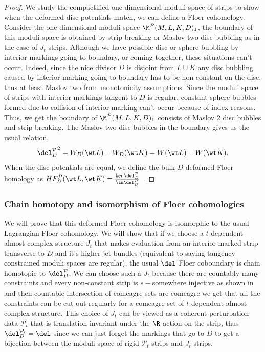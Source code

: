 \begin{proof}

We study the compactified one dimensional moduli space of strips to show when the deformed disc potentials match, we can define a Floer cohomology.  Consider the one dimensional moduli space $\M^{\mathcal{P}}(M,L,K,D)_1$, the boundary of this moduli space is obtained by strip breaking or Maslov two disc bubbling as in the case of $J_t$ strips. Although we have possible disc or sphere bubbling by interior markings going to boundary, or coming together, these situations can't occur. Indeed, since the nice divisor $D$ is disjoint from $L \cup K$ any disc bubbling caused by interior marking going to boundary has to be non-constant on the disc, thus at least Maslov two from monotonicity assumptions. Since the moduli space of strips with interior markings tangent to $D$ is regular, constant sphere bubbles formed due to collision of interior marking can't occur because of index reasons. Thus, we get the boundary of   $\M^{\mathcal{P}}(M,L,K,D)_1$   consists of Maslov 2 disc bubbles and strip breaking.  The Maslov two disc bubbles in the boundary gives us the usual relation, 
$${\del^{\mathcal{P}}_D}^2 = W_D(\wt L) - W_D(\wt K)=W(\wt L) - W(\wt K).$$ When the disc potentials are equal, we define the bulk $D$ deformed Floer homology as  $HF^{\mathcal{P}}_D(\wt L , \wt K) = \frac{\ker \del^{\mathcal{P}}_D }{\im \del^{\mathcal{P}}_D}$ .

\end{proof}

\subsubsection{Chain homotopy and isomorphism of Floer cohomologies}
We will prove that this deformed Floer cohomology is isomorphic to the usual Lagrangian Floer cohomology. We will show that if we choose a $t$ dependent almost complex structure $J_t$ that makes evaluation from an interior marked strip transverse to $D$ and it's higher jet bundles (equivalent to saying tangency constrained moduli spaces are regular), the usual $\del$ Floer coboundary is chain homotopic to $\del^{\mathcal{P}}_D$. We can choose such a $J_t$ because there are countably many constraints and every non-constant strip is $s-$somewhere injective as shown in \cite{FlHStrans} and then countable intersection of comeagre sets are comeagre we get that all the constraints can be cut out regularly for a comeagre set of $t$-dependent almost complex structure. This choice of $J_t$ can be viewed as a coherent perturbation data $\mathcal{P}_t$ that is translation invariant under the $\R$ action on the strip, thus $\del_{D}^{\mathcal{P}_t} = \del$ since we can just forget the markings that go to $D$ to get a bijection between the moduli space of rigid $\mathcal{P}_t$ strips and $J_t$ strips.

